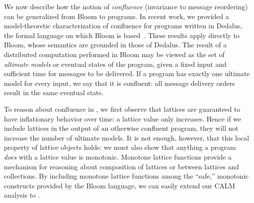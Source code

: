 We now describe how the notion of \emph{confluence} (invariance to message
reordering) can be generalized from Bloom to \lang programs. In recent work, we
provided a model-theoretic characterization of confluence for programs written
in Dedalus, the formal language on which Bloom is based~\cite{dedalus-confluence}. 
These results apply directly to Bloom, whose semantics are grounded in those of
Dedalus.  The result of a distributed computation performed in Bloom may be
viewed as the set of \emph{ultimate models} or eventual states of the program,
given a fixed input and sufficient time for messages to be delivered.  If a
program has exactly one ultimate model for every input, we say that it is
confluent: all message delivery orders result in the same eventual state.

To reason about confluence in \lang, we first observe that lattices are
guaranteed to have inflationary behavior over time: a lattice value only
increases.  Hence if we include lattices in the output of an otherwise confluent
\lang program, they will not increase the number of ultimate models.  It is not
enough, however, that this local property of lattice objects holds: we must also
show that anything a \lang program \emph{does} with a lattice value is
monotonic.  Monotone lattice functions provide a mechanism for reasoning about
composition of lattices or between lattices and collections.  By including
monotone lattice functions among the ``safe,'' monotonic constructs provided by
the Bloom language, we can easily extend our CALM analysis to \lang.
